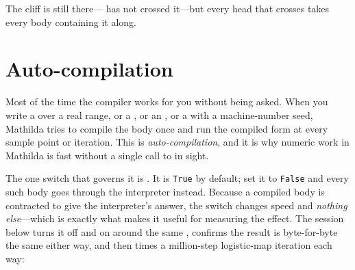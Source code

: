 \begin{codepairs}
\end{codepairs}

\noindent
The cliff is still there--- has not crossed it---but every head that
crosses takes every body containing it along.

\section{Auto-compilation}
\label{sec:compile-auto}

Most of the time the compiler works for you without being asked. When you write a
 over a real range, or a , or an , or a 
with a machine-number seed, Mathilda tries to compile the body once and run the
compiled form at every sample point or iteration. This is \emph{auto-compilation},
and it is why numeric work in Mathilda is fast without a single call to
 in sight.

The one switch that governs it is .
It is \texttt{True} by default; set it to \texttt{False} and every such body goes
through the interpreter instead. Because a compiled body is contracted to give the
interpreter's answer, the switch changes speed and \emph{nothing else}---which is
exactly what makes it useful for measuring the effect. The session below turns it
off and on around the same , confirms the result is byte-for-byte the
same either way, and then times a million-step logistic-map iteration each way:


